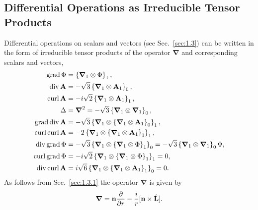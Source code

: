\subsection{Differential Operations as Irreducible Tensor Products}\label{sec:3.2.3}
Differential operations on scalars and vectors (see Sec.~\ref{sec:1.3}) can be written in the form of irreducible tensor products of the operator $\boldsymbol{\nabla}$ and corresponding scalars and vectors,
\begin{align}
\operatorname{grad}  \Phi&=\left\{\boldsymbol{\nabla}_{1} \otimes \Phi\right\}_{1},  \label{eq:3:2:32}\\
\operatorname{div}  \mathbf{A}&=-\sqrt{3}\left\{\boldsymbol{\nabla}_{1} \otimes \mathbf{A}_{1}\right\}_{0},  \label{eq:3:2:33}\\
\operatorname{curl}  \mathbf{A}&=-i \sqrt{2}\left\{\boldsymbol{\nabla}_{1} \otimes \mathbf{A}_{1}\right\}_{1},  \label{eq:3:2:34}\\
\Delta&=\boldsymbol{\nabla}^{2}=-\sqrt{3}\left\{\boldsymbol{\nabla}_{1} \otimes \boldsymbol{\nabla}_{1}\right\}_{0},  \label{eq:3:2:35}\\
\operatorname{grad}  \operatorname{div}  \mathbf{A}&=-\sqrt{3}\left\{\boldsymbol{\nabla}_{1} \otimes\left\{\boldsymbol{\nabla}_{1} \otimes \mathbf{A}_{1}\right\}_{0}\right\}_{1},  \label{eq:3:2:36}\\
\operatorname{curl}  \operatorname{curl}  \mathbf{A}&=-2\left\{\boldsymbol{\nabla}_{1} \otimes\left\{\boldsymbol{\nabla}_{1} \otimes \mathbf{A}_{1}\right\}_{1}\right\}_{1},  \label{eq:3:2:37}\\
\operatorname{div}  \operatorname{grad}  \Phi&=-\sqrt{3}\left\{\boldsymbol{\nabla}_{1} \otimes\left\{\boldsymbol{\nabla}_{1} \otimes \Phi\right\}_{1}\right\}_{0}=-\sqrt{3}\left\{\boldsymbol{\nabla}_{1} \otimes \boldsymbol{\nabla}_{1}\right\}_{0} \Phi,  \label{eq:3:2:38}\\
\operatorname{curl}  \operatorname{grad}  \Phi&=-i \sqrt{2}\left\{\boldsymbol{\nabla}_{1} \otimes\left\{\boldsymbol{\nabla}_{1} \otimes \Phi\right\}_{1}\right\}_{1}=0,  \label{eq:3:2:39}\\
\operatorname{div}  \operatorname{curl}  \mathbf{A}&=i \sqrt{6}\left\{\boldsymbol{\nabla}_{1} \otimes\left\{\boldsymbol{\nabla}_{1} \otimes \mathbf{A}_{1}\right\}_{1}\right\}_{0}=0 . \label{eq:3:2:40}
\end{align}
As follows from Sec.~\ref{sec:1.3.1} the operator $\boldsymbol{\nabla}$ is given by
\begin{equation}
\boldsymbol{\nabla}=\mathbf{n} \frac{\partial}{\partial r}-\frac{i}{r}[\mathbf{n} \times \hat{\mathbf{L}}]. \label{eq:3:2:41}
\end{equation}
